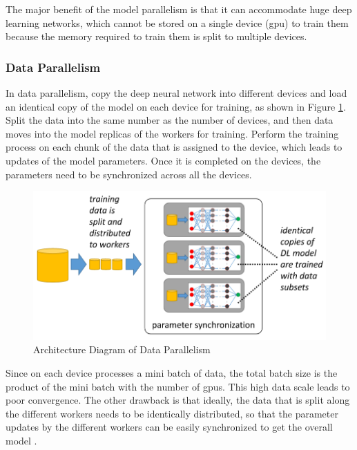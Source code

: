 The major benefit of the model parallelism is that it can accommodate huge deep learning networks, which cannot be stored on a single device (\acrshort{gpu}) to train them because the memory required to train them is split to multiple devices. 

\subsubsection{Data Parallelism}
In data parallelism, copy the deep neural network into different devices and load an identical copy of the model on each device for training, as shown in Figure \ref{fig:dataparallel}. Split the data into the same number as the number of devices, and then data moves into the model replicas of the workers for training. Perform the training process on each chunk of the data that is assigned to the device, which leads to updates of the model parameters. Once it is completed on the devices, the parameters need to be synchronized across all the devices. 

\begin{figure}[ht]
  \begin{center}
    \includegraphics[width=\textwidth]{images/data parallelism.png} 
    \caption{Architecture Diagram of Data Parallelism  \cite{Mayer2020ScalableInfrastructures}}
    \label{fig:dataparallel}
  \end{center}
\end{figure}

Since on each device processes a mini batch of data, the total batch size is the product of the mini batch with the number of \acrshort{gpu}s. This high data scale leads to poor convergence. The other drawback is that ideally, the data that is split along the different workers needs to be identically distributed, so that the parameter updates by the different workers can be easily synchronized to get the overall model \cite{Jia2018BeyondNetworks}.

